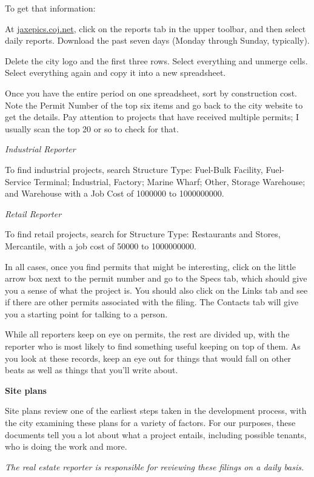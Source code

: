 \documentclass[
  11pt,
  american,
  letterpaperpaper,
  extrafontsizes,onecolumn,openright
  ]{memoir}
\newlength{\rf}
\begin{document}
To get that information:

At \href{https://jaxepics.coj.net/}{jaxepics.coj.net}, click on the reports tab in the upper toolbar, and then select daily reports. Download the past seven days (Monday through Sunday, typically).

Delete the city logo and the first three rows. Select everything and unmerge cells. Select everything again and copy it into a new spreadsheet.

Once you have the entire period on one spreadsheet, sort by construction cost. Note the Permit Number of the top six items and go back to the city website to get the details. Pay attention to projects that have received multiple permits; I usually scan the top 20 or so to check for that.

\emph{Industrial Reporter}

To find industrial projects, search Structure Type: Fuel-Bulk Facility, Fuel-Service Terminal; Industrial, Factory; Marine Wharf; Other, Storage Warehouse; and Warehouse with a Job Cost of 1000000 to 1000000000.

\emph{Retail Reporter}

To find retail projects, search for Structure Type: Restaurants and Stores, Mercantile, with a job cost of 50000 to 1000000000.

In all cases, once you find permits that might be interesting, click on the little arrow box next to the permit number and go to the Specs tab, which should give you a sense of what the project is. You should also click on the Links tab and see if there are other permits associated with the filing. The Contacts tab will give you a starting point for talking to a person.

While all reporters keep on eye on permits, the rest are divided up, with the reporter who is most likely to find something useful keeping on top of them. As you look at these records, keep an eye out for things that would fall on other beats as well as things that you'll write about.

\textbf{Site plans}

Site plans review one of the earliest steps taken in the development process, with the city examining these plans for a variety of factors. For our purposes, these documents tell you a lot about what a project entails, including possible tenants, who is doing the work and more.

\emph{The real estate reporter is responsible for reviewing these filings on a daily basis.}
\end{document}
